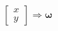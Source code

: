 \documentclass[preview]{standalone}
\begin{document}
\begin{align*}
\begin{bmatrix} x \\ y \end{bmatrix} \Rightarrow \mathbf{\omega}
\end{align*}
\end{document}
